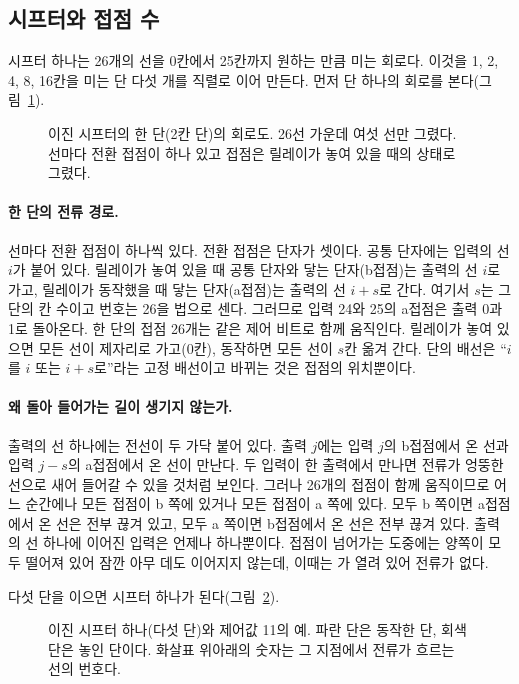 \subsection{시프터와 접점 수}

시프터 하나는 26개의 선을 0칸에서 25칸까지 원하는 만큼 미는 회로다. 이것을 1, 2, 4, 8, 16칸을 미는 단 다섯
개를 직렬로 이어 만든다. 먼저 단 하나의 회로를 본다(그림~\ref{fig:hw-stage}).

\begin{figure}[ht]
\centering

\caption{이진 시프터의 한 단(2칸 단)의 회로도. 26선 가운데 여섯 선만 그렸다. 선마다 전환 접점이 하나 있고
접점은 릴레이가 놓여 있을 때의 상태로 그렸다.}
\label{fig:hw-stage}
\end{figure}

\paragraph{한 단의 전류 경로.} 선마다 전환 접점이 하나씩 있다. 전환 접점은 단자가 셋이다. 공통 단자에는
입력의 선 $i$가 붙어 있다. 릴레이가 놓여 있을 때 공통 단자와 닿는 단자(b접점)는 출력의 선 $i$로 가고,
릴레이가 동작했을 때 닿는 단자(a접점)는 출력의 선 $i+s$로 간다. 여기서 $s$는 그 단의 칸 수이고 번호는 26을
법으로 센다. 그러므로 입력 24와 25의 a접점은 출력 0과 1로 돌아온다. 한 단의 접점 26개는 같은 제어 비트로
함께 움직인다. 릴레이가 놓여 있으면 모든 선이 제자리로 가고(0칸), 동작하면 모든 선이 $s$칸 옮겨 간다.
단의 배선은 ``$i$를 $i$ 또는 $i+s$로''라는 고정 배선이고 바뀌는 것은 접점의 위치뿐이다.

\paragraph{왜 돌아 들어가는 길이 생기지 않는가.} 출력의 선 하나에는 전선이 두 가닥 붙어 있다. 출력 $j$에는
입력 $j$의 b접점에서 온 선과 입력 $j-s$의 a접점에서 온 선이 만난다. 두 입력이 한 출력에서 만나면 전류가
엉뚱한 선으로 새어 들어갈 수 있을 것처럼 보인다. 그러나 26개의 접점이 함께 움직이므로 어느 순간에나 모든
접점이 b 쪽에 있거나 모든 접점이 a 쪽에 있다. 모두 b 쪽이면 a접점에서 온 선은 전부 끊겨 있고, 모두 a
쪽이면 b접점에서 온 선은 전부 끊겨 있다. 출력의 선 하나에 이어진 입력은 언제나 하나뿐이다. 접점이 넘어가는
도중에는 양쪽이 모두 떨어져 있어 잠깐 아무 데도 이어지지 않는데, 이때는 가 열려 있어 전류가
없다.

다섯 단을 이으면 시프터 하나가 된다(그림~\ref{fig:hw-shifter}).

\begin{figure}[ht]
\centering

\caption{이진 시프터 하나(다섯 단)와 제어값 11의 예. 파란 단은 동작한 단, 회색 단은 놓인 단이다. 화살표
위아래의 숫자는 그 지점에서 전류가 흐르는 선의 번호다.}
\label{fig:hw-shifter}
\end{figure}

